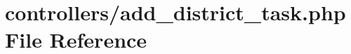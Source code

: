 \hypertarget{add__district__task_8php}{}\section{controllers/add\+\_\+district\+\_\+task.php File Reference}
\label{add__district__task_8php}
